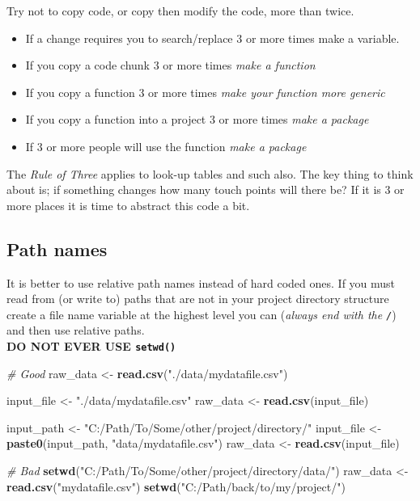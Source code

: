 \documentclass[]{book}
\newenvironment{Shaded}{\begin{snugshade}}{\end{snugshade}}
\newcommand{\KeywordTok}[1]{\textcolor[rgb]{0.13,0.29,0.53}{\textbf{#1}}}
\newcommand{\StringTok}[1]{\textcolor[rgb]{0.31,0.60,0.02}{#1}}
\newcommand{\CommentTok}[1]{\textcolor[rgb]{0.56,0.35,0.01}{\textit{#1}}}
\newcommand{\NormalTok}[1]{#1}
\providecommand{\tightlist}{%
  \setlength{\itemsep}{0pt}\setlength{\parskip}{0pt}}
\theoremstyle{definition}
\theoremstyle{definition}
\theoremstyle{definition}
\theoremstyle{remark}
\begin{document}
Try not to copy code, or copy then modify the code, more than twice.

\begin{itemize}
\tightlist
\item
  If a change requires you to search/replace 3 or more times make a
  variable.
\item
  If you copy a code chunk 3 or more times \emph{make a function}
\item
  If you copy a function 3 or more times \emph{make your function more
  generic}
\item
  If you copy a function into a project 3 or more times \emph{make a
  package}
\item
  If 3 or more people will use the function \emph{make a package}
\end{itemize}

The \emph{Rule of Three} applies to look-up tables and such also. The
key thing to think about is; if something changes how many touch points
will there be? If it is 3 or more places it is time to abstract this
code a bit.

\subsection{Path names}\label{path-names}

It is better to use relative path names instead of hard coded ones. If
you must read from (or write to) paths that are not in your project
directory structure create a file name variable at the highest level you
can (\emph{always end with the \texttt{/}}) and then use relative
paths.\\
\textbf{DO NOT EVER USE \texttt{setwd()}}

\begin{Shaded}
\begin{Highlighting}[]
\CommentTok{# Good}
\NormalTok{raw_data <-}\StringTok{ }\KeywordTok{read.csv}\NormalTok{(}\StringTok{"./data/mydatafile.csv"}\NormalTok{) }

\NormalTok{input_file <-}\StringTok{ "./data/mydatafile.csv"}
\NormalTok{raw_data <-}\StringTok{ }\KeywordTok{read.csv}\NormalTok{(input_file)  }

\NormalTok{input_path <-}\StringTok{ "C:/Path/To/Some/other/project/directory/"}
\NormalTok{input_file <-}\StringTok{ }\KeywordTok{paste0}\NormalTok{(input_path, }\StringTok{"data/mydatafile.csv"}\NormalTok{)}
\NormalTok{raw_data <-}\StringTok{ }\KeywordTok{read.csv}\NormalTok{(input_file)}

\CommentTok{# Bad}
\KeywordTok{setwd}\NormalTok{(}\StringTok{"C:/Path/To/Some/other/project/directory/data/"}\NormalTok{)}
\NormalTok{raw_data <-}\StringTok{ }\KeywordTok{read.csv}\NormalTok{(}\StringTok{"mydatafile.csv"}\NormalTok{)}
\KeywordTok{setwd}\NormalTok{(}\StringTok{"C:/Path/back/to/my/project/"}\NormalTok{)}
\end{Highlighting}
\end{Shaded}
\end{document}
